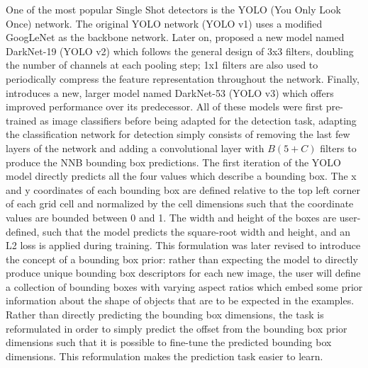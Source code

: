 One of the most popular Single Shot detectors is the YOLO (You Only Look Once) network. The original YOLO network (YOLO v1) \cite{Redmon2015-cy} uses a modified GoogLeNet as the backbone network. Later on, \cite{Redmon2016-ad} proposed a new model named DarkNet-19 (YOLO v2) which follows the general design of 3x3 filters, doubling the number of channels at each pooling step; 1x1 filters are also used to periodically compress the feature representation throughout the network. Finally, \cite{Redmon_undated-wa} introduces a new, larger model named DarkNet-53 (YOLO v3) which offers improved performance over its predecessor. All of these models were first pre-trained as image classifiers before being adapted for the detection task, adapting the classification network for detection simply consists of removing the last few layers of the network and adding a convolutional layer with $B(5+C)$ filters to produce the NNB bounding box predictions. The first iteration of the YOLO model directly predicts all the four values which describe a bounding box. The x and y coordinates of each bounding box are defined relative to the top left corner of each grid cell and normalized by the cell dimensions such that the coordinate values are bounded between 0 and 1. The width and height of the boxes are user-defined, such that the model predicts the square-root width and height, and an L2 loss is applied during training. This formulation was later revised to introduce the concept of a bounding box prior: rather than expecting the model to directly produce unique bounding box descriptors for each new image, the user will define a collection of bounding boxes with varying aspect ratios which embed some prior information about the shape of objects that are to be expected in the examples. Rather than directly predicting the bounding box dimensions, the task is reformulated in order to simply predict the offset from the bounding box prior dimensions such that it is possible to fine-tune the predicted bounding box dimensions. This reformulation makes the prediction task easier to learn.